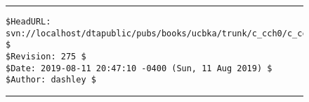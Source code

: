 \noindent\begin{figure}[!b]
\noindent\rule[-0.25in]{\textwidth}{1pt}
\begin{tiny}
\begin{verbatim}
$HeadURL: svn://localhost/dtapublic/pubs/books/ucbka/trunk/c_cch0/c_cch0.tex $
$Revision: 275 $
$Date: 2019-08-11 20:47:10 -0400 (Sun, 11 Aug 2019) $
$Author: dashley $
\end{verbatim}
\end{tiny}
\noindent\rule[0.25in]{\textwidth}{1pt}
\end{figure}
%
